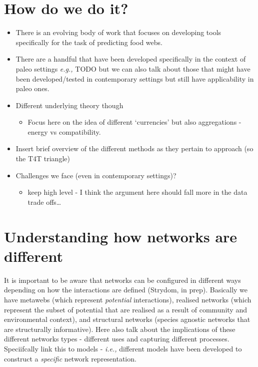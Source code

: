\documentclass[
]{article}
\providecommand{\tightlist}{%
  \setlength{\itemsep}{0pt}\setlength{\parskip}{0pt}}
\begin{document}
\section{How do we do it?}\label{how-do-we-do-it}

\begin{itemize}
\item
  There is an evolving body of work that focuses on developing tools
  specifically for the task of predicting food webs.
\item
  There are a handful that have been developed specifically in the
  context of paleo settings \emph{e.g.,} TODO but we can also talk about
  those that might have been developed/tested in contemporary settings
  but still have applicability in paleo ones.
\item
  Different underlying theory though

  \begin{itemize}
  \tightlist
  \item
    Focus here on the idea of different `currencies' but also
    aggregations - energy vs compatibility.
  \end{itemize}
\item
  Insert brief overview of the different methods as they pertain to
  approach (so the T4T triangle)
\item
  Challenges we face (even in contemporary settings)?

  \begin{itemize}
  \tightlist
  \item
    keep high level - I think the argument here should fall more in the
    data trade offs\ldots{}
  \end{itemize}
\end{itemize}

\section{Understanding how networks are
different}\label{understanding-how-networks-are-different}

It is important to be aware that networks can be configured in different
ways depending on how the interactions are defined (Strydom, in prep).
Basically we have metawebs (which represent \emph{potential}
interactions), realised networks (which represent the subset of
potential that are realised as a result of community and environmental
context), and structural networks (species agnostic networks that are
structurally informative). Here also talk about the implications of
these different networks types - different uses and capturing different
processes. Speciifcally link this to models - \emph{i.e.,} different
models have been developed to construct a \emph{specific} network
representation.
\end{document}
